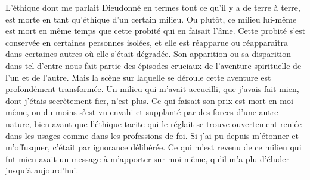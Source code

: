 

L'éthique dont me parlait Dieudonné en termes tout ce qu'il y a de terre à terre, est morte en tant qu'éthique d'un certain milieu. Ou plutôt, ce milieu lui-même est mort en même temps que cette probité qui en faisait l'âme. Cette probité s'est conservée en certaines personnes isolées, et elle est réapparue ou réapparaîtra dans certaines autres où elle s'était dégradée. Son apparition ou sa disparition dans tel d'entre nous fait partie des épisodes cruciaux de l'aventure spirituelle de l'un et de l'autre. Mais la scène sur laquelle se déroule cette aventure est profondément transformée. Un milieu qui m'avait accueilli, que j'avais fait mien, dont j'étais secrètement fier, n'est plus. Ce qui faisait son prix est mort en moi-même, ou du moins s'est vu envahi et supplanté par des forces d'une autre nature, bien avant que l'éthique tacite qui le réglait se trouve ouvertement reniée dans les usages comme dans les professions de foi. Si j'ai pu depuis m'étonner et m'offusquer, c'était par ignorance délibérée. Ce qui m'est revenu de ce milieu qui fut mien avait un message à m'apporter sur moi-même, qu'il m'a plu d'éluder jusqu'à aujourd'hui.


